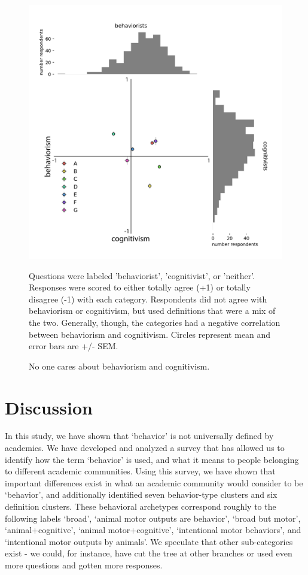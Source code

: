 \documentclass[a4paper, 11pt]{article}
\begin{document}
\begin{figure}
\centerline{\includegraphics[width=\textwidth]{fig6.pdf}}
\caption{No one cares about behaviorism and cognitivism.} Questions were labeled 'behaviorist', 'cognitivist', or 'neither'. Responses were scored to either totally agree (+1) or totally disagree (-1) with each category. Respondents did not agree with behaviorism or cognitivism, but used definitions that were a mix of the two. Generally, though, the categories had a negative correlation between behaviorism and cognitivism. Circles represent mean and error bars are +/- SEM.
\end{figure}

\section*{Discussion}

In this study, we have shown that `behavior' is not universally defined by academics. We have developed and analyzed a survey that has allowed us to identify how the term `behavior' is used, and what it means to people belonging to different academic communities. Using this survey, we have shown that important differences exist in what an academic community would consider to be `behavior', and additionally identified seven behavior-type clusters and six definition clusters. These behavioral archetypes correspond roughly to the following labels `broad', `animal motor outputs are behavior', `broad but motor', `animal+cognitive', `animal motor+cognitive', `intentional motor behaviors', and `intentional motor outputs by animals'. We speculate that other sub-categories exist - we could, for instance, have cut the tree at other branches or used even more questions and gotten more responses. 
\end{document}
